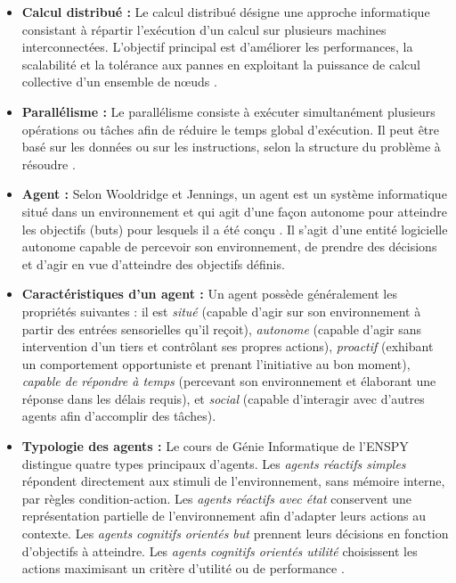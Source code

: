 \documentclass[12pt,a4paper]{report}
\begin{document}
\begin{itemize}

    \item[$\bullet$] \textbf{Calcul distribué :} Le calcul distribué désigne une approche informatique consistant à répartir l'exécution d'un calcul sur plusieurs machines interconnectées. L'objectif principal est d'améliorer les performances, la scalabilité et la tolérance aux pannes en exploitant la puissance de calcul collective d'un ensemble de nœuds \cite{tanenbaum_ds}.

    \item[$\bullet$] \textbf{Parallélisme :} Le parallélisme consiste à exécuter simultanément plusieurs opérations ou tâches afin de réduire le temps global d'exécution. Il peut être basé sur les données ou sur les instructions, selon la structure du problème à résoudre \cite{tanenbaum_ds}.

    \item[$\bullet$] \textbf{Agent :} Selon Wooldridge et Jennings, un agent est un système informatique situé dans un environnement et qui agit d'une façon autonome pour atteindre les objectifs (buts) pour lesquels il a été conçu \cite{wooldridge}. Il s'agit d'une entité logicielle autonome capable de percevoir son environnement, de prendre des décisions et d'agir en vue d'atteindre des objectifs définis.

    \item[$\bullet$] \textbf{Caractéristiques d'un agent :} Un agent possède généralement les propriétés suivantes \cite{wooldridge, chapitre1} : il est \textit{situé} (capable d'agir sur son environnement à partir des entrées sensorielles qu'il reçoit), \textit{autonome} (capable d'agir sans intervention d'un tiers et contrôlant ses propres actions), \textit{proactif} (exhibant un comportement opportuniste et prenant l'initiative au bon moment), \textit{capable de répondre à temps} (percevant son environnement et élaborant une réponse dans les délais requis), et \textit{social} (capable d'interagir avec d'autres agents afin d'accomplir des tâches).

    \item[$\bullet$] \textbf{Typologie des agents :} Le cours de Génie Informatique de l'ENSPY \cite{chapitre2} distingue quatre types principaux d'agents. Les \textit{agents réactifs simples} répondent directement aux stimuli de l'environnement, sans mémoire interne, par règles condition-action. Les \textit{agents réactifs avec état} conservent une représentation partielle de l'environnement afin d'adapter leurs actions au contexte. Les \textit{agents cognitifs orientés but} prennent leurs décisions en fonction d'objectifs à atteindre. Les \textit{agents cognitifs orientés utilité} choisissent les actions maximisant un critère d'utilité ou de performance \cite{wooldridge}.


\end{itemize}
\end{document}
